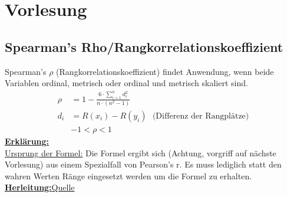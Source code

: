 \section{Vorlesung}

\subsection{Spearman's Rho/Rangkorrelationskoeffizient}
Spearman's $\rho$ (Rangkorrelationskoeffizient) findet Anwendung, wenn beide Variablen ordinal, metrisch oder ordinal und metrisch skaliert sind.
\begin{align*}
  \rho &= 1 - \frac{6 \cdot \sum^{n}_{i=1}{d^2_i}}{n \cdot (n^2-1)}\\
  d_i  &= R(x_i) - R(y_i)~~~\textrm{(Differenz der Rangplätze)}\\
  &-1 < \rho < 1
\end{align*}
\textbf{\underline{Erklärung:}} \\
\underline{Ursprung der Formel:} Die Formel ergibt sich (Achtung, vorgriff auf nächste Vorlesung) aus einem Spezialfall von Pearson's r. Es muss lediglich statt den wahren Werten Ränge eingesetzt werden um die Formel zu erhalten. \\
\underline{\textbf{Herleitung:}}\hspace{15cm}\href{https://stats.stackexchange.com/questions/89121/prove-the-equivalence-of-the-following-two-formulas-for-spearman-correlation}{Quelle}
